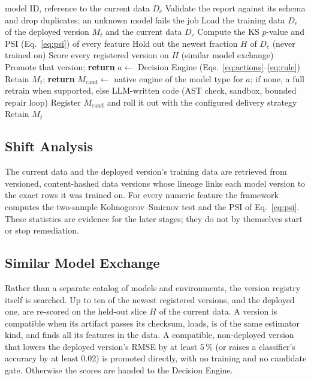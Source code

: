 \documentclass[conference]{IEEEtran}
\begin{document}
\begin{algorithm}[t]
\caption{Readaptation pipeline for one degradation report}
\label{alg:pipeline}
\begin{algorithmic}[1]
\REQUIRE model ID, reference to the current data $D_c$
\STATE Validate the report against its schema and drop duplicates; an unknown model fails the job
\STATE Load the training data $D_r$ of the deployed version $M_t$ and the current data $D_c$
\STATE Compute the KS $p$-value and PSI (Eq.~\ref{eq:psi}) of every feature
\STATE Hold out the newest fraction $H$ of $D_c$ (never trained on)
\STATE Score every registered version on $H$ (similar model exchange)
  \STATE Promote that version; \textbf{return}
\ENDIF
\STATE $a \leftarrow$ Decision Engine (Eqs.~\ref{eq:actions}--\ref{eq:rule})
  \STATE Retain $M_t$; \textbf{return}
\ENDIF
\STATE $M_{\text{cand}} \leftarrow$ native engine of the model type for $a$; if none, a full
retrain when supported, else LLM-written code (AST check, sandbox, bounded repair loop)
  \STATE Register $M_{\text{cand}}$ and roll it out with the configured delivery strategy
\ELSE
  \STATE Retain $M_t$
\ENDIF
\end{algorithmic}
\end{algorithm}

\subsection{Shift Analysis}
The current data and the deployed version's training data are retrieved from versioned,
content-hashed data versions whose lineage links each model version to the exact rows it was
trained on. For every numeric feature the framework computes the two-sample
Kolmogorov--Smirnov test and the PSI of Eq.~\eqref{eq:psi}. These statistics are evidence for
the later stages; they do not by themselves start or stop remediation.

\subsection{Similar Model Exchange}
Rather than a separate catalog of models and environments, the version registry itself is
searched. Up to ten of the newest registered versions, and the deployed one, are re-scored on
the held-out slice $H$ of the current data. A version is compatible when its artifact passes its
checksum, loads, is of the same estimator kind, and finds all its features in the data. A
compatible, non-deployed version that lowers the deployed version's RMSE by at least 5\,\% (or
raises a classifier's accuracy by at least 0.02) is promoted directly, with no training and no
candidate gate. Otherwise the scores are handed to the Decision Engine.
\end{document}
